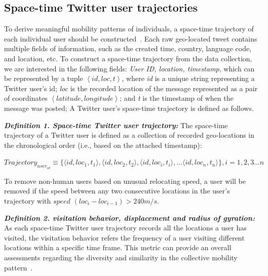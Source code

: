 \documentclass[a4paper, 11pt]{article}
\begin{document}
\subsection{Space-time Twitter user trajectories}
To derive meaningful mobility patterns of individuals, a space-time trajectory of each individual user should be constructed~\citep{hagerstrand1985time}.
Each raw geo-located tweet contains multiple fields of information, such as the created time, country, language code, and location, etc. To construct a space-time trajectory from the data collection, we are interested in the following fields: \textit{User ID, location, timestamp}, which can be represented by a tuple $\left\langle id, loc, t\right\rangle$, where \textit{id} is a unique string representing a Twitter user's id; \textit{loc} is the recorded location of the message represented as a pair of coordinates $\left\langle latitude, longitude\right\rangle$;
and \textit{t} is the timestamp of when the message was posted; A Twitter user's space-time trajectory is defined as follows.
\newline

\noindent\emph{\textbf{Definition 1. Space-time Twitter user trajectory:}} The space-time trajectory of a Twitter user is defined as a collection of recorded geo-locations in the chronological order (i.e., based on the attached timestamp):
\newline

$Trajectory_{user_{id}} \equiv \lbrace \langle id, loc_{1}, t_{1}\rangle, \langle id, loc_{2}, t_{2}\rangle, \langle id, loc_{i}, t_{i}\rangle, ... \langle id, loc_{n}, t_{n}\rangle \rbrace, i = 1, 2, 3...n$
\newline

To remove non-human users based on unusual relocating speed, a user will be removed if the speed between any two consecutive locations in the user's trajectory with $speed$ $(loc_{i} - loc_{i-1}) > 240 m/s $.
\newline

\noindent\emph{\textbf{Definition 2. visitation behavior, displacement and radius of gyration:}} As each space-time Twitter user trajectory records all the locations a user has visited, the visitation behavior refers the frequency of a user visiting different locations within a specific time frame.
This metric can provide an overall assessments regarding the diversity and similarity in the collective mobility pattern~\citep{gao2012exploring}.
\end{document}
